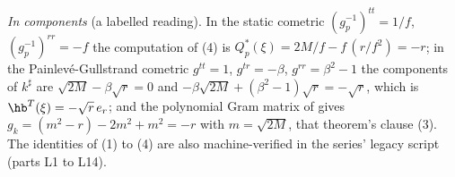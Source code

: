\emph{In components} (a labelled reading). In the static cometric $(g_p^{-1})^{tt} = 1/f$, $(g_p^{-1})^{rr} = -f$ the computation of (4) is $Q^{*}_p(\xi) = 2M/f - f\,(r/f^{2}) = -r$; in the Painlev\'e-Gullstrand cometric $g^{tt} = 1$, $g^{tr} = -\beta$, $g^{rr} = \beta^{2} - 1$ the components of $k^{\sharp}$ are $\sqrt{2M} - \beta\sqrt r = 0$ and $-\beta\sqrt{2M} + (\beta^{2} - 1)\sqrt r = -\sqrt r$, which is $\hb^{T}(\xi) = -\sqrt r\,e_{r}$; and the polynomial Gram matrix of \cite[Thm.~8.7]{ButlerT4} gives $g_{k} = (m^{2} - r) - 2m^{2} + m^{2} = -r$ with $m = \sqrt{2M}$, that theorem's clause (3). The identities of (1) to (4) are also machine-verified in the series' legacy script (parts L1 to L14).
